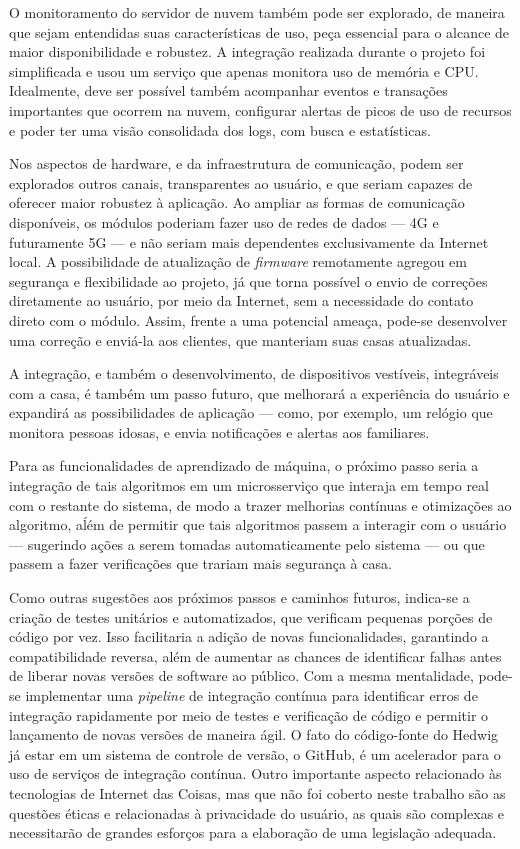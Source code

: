 O monitoramento do servidor de nuvem também pode ser explorado, de maneira que sejam entendidas suas características de uso, peça essencial para o alcance de maior disponibilidade e robustez. A integração realizada durante o projeto foi simplificada e usou um serviço que apenas monitora uso de memória e CPU. Idealmente, deve ser possível também acompanhar eventos e transações importantes que ocorrem na nuvem, configurar alertas de picos de uso de recursos e poder ter uma visão consolidada dos logs, com busca e estatísticas.

Nos aspectos de hardware, e da infraestrutura de comunicação, podem ser explorados outros canais, transparentes ao usuário, e que seriam capazes de oferecer maior robustez à aplicação. Ao ampliar as formas de comunicação disponíveis, os módulos poderiam fazer uso de redes de dados --- 4G e futuramente 5G --- e não seriam mais dependentes exclusivamente da Internet local. A possibilidade de atualização de \textit{firmware} remotamente agregou em segurança e flexibilidade ao projeto, já que torna possível o envio de correções diretamente ao usuário, por meio da Internet, sem a necessidade do contato direto com o módulo. Assim, frente a uma potencial ameaça, pode-se desenvolver uma correção e enviá-la aos clientes, que manteriam suas casas atualizadas.

A integração, e também o desenvolvimento, de dispositivos vestíveis, integráveis com a casa, é também um passo futuro, que melhorará a experiência do usuário e expandirá as possibilidades de aplicação --- como, por exemplo, um relógio que monitora pessoas idosas, e envia notificações e alertas aos familiares.

Para as funcionalidades de aprendizado de máquina, o próximo passo seria a integração de tais algoritmos em um microsserviço que interaja em tempo real com o restante do sistema, de modo a trazer melhorias contínuas e otimizações ao algoritmo, aĺém de permitir que tais algoritmos passem a interagir com o usuário --- sugerindo ações a serem tomadas automaticamente pelo sistema --- ou que passem a fazer verificações que trariam mais segurança à casa.

Como outras sugestões aos próximos passos e caminhos futuros, indica-se a criação de testes unitários e automatizados, que verificam pequenas porções de código por vez. Isso facilitaria a adição de novas funcionalidades, garantindo a compatibilidade reversa, além de aumentar as chances de identificar falhas antes de liberar novas versões de software ao público. Com a mesma mentalidade, pode-se implementar uma \textit{pipeline} de integração contínua para identificar erros de integração rapidamente por meio de testes e verificação de código e permitir o lançamento de novas versões de maneira ágil. O fato do código-fonte do Hedwig já estar em um sistema de controle de versão, o GitHub, é um acelerador para o uso de serviços de integração contínua. Outro importante aspecto relacionado às tecnologias de Internet das Coisas, mas que não foi coberto neste trabalho são as questões éticas e relacionadas à privacidade do usuário, as quais são complexas e necessitarão de grandes esforços para a elaboração de uma legislação adequada.
